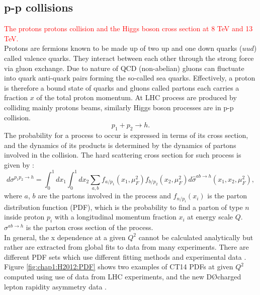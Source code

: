 \subsection{p-p collisions}
\label{chap1:H2012:PP}
\textcolor{red}{The protons protons collision and the Higgs boson cross section at 8 TeV and 13 TeV. \\}
Protons are fermions known to be made up of two up and one down quarks ($uud$) called valence quarks. They interact between each other through the strong force via gluon exchange. Due to nature of QCD (non-abelian) gluons can fluctuate into quark anti-quark pairs forming the so-called sea quarks. Effectively, a proton is therefore a bound state of quarks and gluons called partons each carries a fraction $x$ of the total proton momentum. At LHC process are produced by colliding mainly protons beams, similarly Higgs boson processes are in p-p collision.
\begin{equation}
    p_1 + p_2 \rightarrow h.
\end{equation}
The probability for a process to occur is expressed in terms of its cross section, and the dynamics of its products is determined by the dynamics of partons involved in the collision. The hard scattering cross section for such process is given by :
\begin{equation}
    d \sigma^{p_{1} p_{2} \rightarrow h}=\int_{0}^{1} d x_{1} \int_{0}^{1} d x_{2} \sum_{a, b} f_{a / p_{1}}\left(x_{1}, \mu_{F}^{2}\right) f_{b / p_{2}}\left(x_{2}, \mu_{F}^{2}\right) d \hat{\sigma}^{a b \rightarrow h}\left(x_1, x_2, \mu_{F}^{2}\right), 
\end{equation}
where $a$, $b$ are the partons involved in the process and $f_{n/p_i}(x_i)$ is the parton distribution function (PDF), which is the probability to find a parton of type $n$ inside proton $p_i$ with a longitudinal momentum fraction $x_i$ at energy scale $Q$. $\sigma^{a b \rightarrow h}$ is the parton cross section of the process. \\
In general, the x dependence at a given $Q^2$ cannot be calculated analytically but rather are extracted from global fits to data from many experiments. There are different PDF sets which use different fitting methods and experimental data \cite{PDF}. Figure \ref{fig:chap1:H2012:PDF} shows two examples of CT14 PDFs at given $Q^2$ computed using use of data from LHC experiments, and the new D\O charged lepton rapidity asymmetry data \cite{CT14}. 
